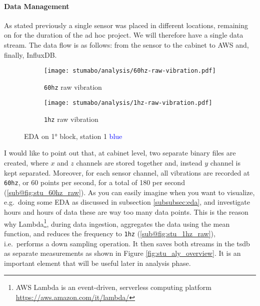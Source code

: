 \paragraph{Data Management}
As stated previously a single sensor was placed in different locations, remaining on for the duration of the ad hoc project. We will therefore have a single data stream.
The data flow is as follows: from the sensor to the cabinet to AWS and, finally, InfluxDB.
\begin{figure}[ht]
    \begin{subfigure}{.495\textwidth}
        \texttt{[image: stumabo/analysis/60hz-raw-vibration.pdf]}
        \caption{\texttt{60hz} raw vibration}
        \label{fig:stu_60hz_raw}
    \end{subfigure}
    \begin{subfigure}{.495\textwidth}
        \texttt{[image: stumabo/analysis/1hz-raw-vibration.pdf]}
        \caption{\texttt{1hz} raw vibration}
        \label{fig:stu_1hz_raw}
    \end{subfigure}
    \caption{\acl{EDA} on 1° block, station 1 \textcolor{blue}{blue}}
    \label{fig:stu_2_raw_data}
\end{figure}
I would like to point out that, at cabinet level, two separate binary files are created, where $x$ and $z$ channels are stored together and, instead $y$ channel is kept separated. 
Moreover, for each sensor channel, all vibrations are recorded at \texttt{60hz},  or 60 points per second, for a total of 180 per second (\ref{sub@fig:stu_60hz_raw}).
As you can easily imagine when you want to visualize, e.g.\ doing some \ac{EDA} as discussed in subsection \ref{subsubsec:eda}, 
and investigate hours and hours of data these are way too many data points.
This is the reason why Lambda\footnote{AWS Lambda is an event-driven, serverless computing platform \url{https://aws.amazon.com/it/lambda/}}, 
during data ingestion, aggregates the data using the mean function, and reduces the frequency to \texttt{1hz} (\ref{sub@fig:stu_1hz_raw}), i.e.\ 
performs a down sampling operation. It then saves both streams in the \ac{tsdb} as separate measurements as shown in Figure \ref{fig:stu_aly_overview}. 
It is an important element that will be useful later in analysis phase.

